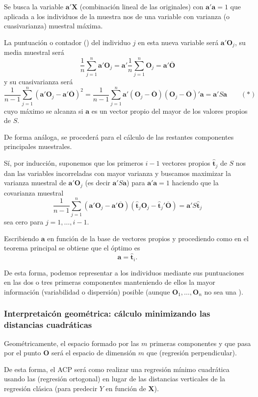 Se busca la variable $\mathbf{a'X}$ (combinación lineal de las originales) con $\mathbf{a'a}=1$ que aplicada a los individuos de la muestra nos de una variable con varianza (o cuasivarianza) muestral máxima.

La puntuación o contador () del individuo $j$ en esta nueva variable será $\mathbf{a'O}_j$, su media muestral será \[ \dfrac{1}{n}\sum_{j=1}^{n}\mathbf{a'O}_j=\mathbf{a'}\dfrac{1}{n}\sum_{j=1}^{n}\mathbf{O}_j=\mathbf{a'\overline{O}} \] y su cuasivarianza será \[ \dfrac{1}{n-1}\sum_{j=1}^{n}(\mathbf{a'O}_j-\mathbf{a'\overline{O}})^2=\dfrac{1}{n-1}\sum_{j=1}^{n}\mathbf{a'}(\mathbf{O}_j-\overline{\mathbf{O}})(\mathbf{O}_j-\overline{\mathbf{O}})'\mathbf{a}=\mathbf{a'}S\mathbf{a}\qquad(\ast) \]cuyo máximo se alcanza si $\mathbf{a}$ es un vector propio del mayor de los valores propios de $S$.

De forma análoga, se procederá para el cálculo de las restantes componentes principales muestrales.

Sí, por inducción, suponemos que los primeros $i-1$ vectores propios $\mathbf{\hat{t}}_j$ de $S$ nos dan las variables incorreladas con mayor varianza y buscamos maximizar la varianza muestral de $\mathbf{a'O}_j$ (es decir $\mathbf{a}'S\mathbf{a}$) para $\mathbf{a'a}=1$ haciendo que la covarianza muestral \[ \dfrac{1}{n-1}\sum_{j=1}^{n}(\mathbf{a'O}_j-\mathbf{a'\overline{O}})(\mathbf{\hat{t}}_j\mathbf{O}_j-\mathbf{\hat{t}}_j'\overline{\mathbf{O}})=\mathbf{a}'S\mathbf{\hat{t}}_j \]sea cero para $j=1,\dots,i-1$.

Escribiendo $\mathbf{a}$ en función de la base de vectores propios y procediendo como en el teorema principal se obtiene que el óptimo es \[ \mathbf{a}=\mathbf{\hat{t}}_i. \]

De esta forma, podemos representar a los individuos mediante sus puntuaciones en las dos o tres primeras componentes manteniendo de ellos la mayor información (variabilidad o dispersión) posible (aunque $\mathbf{O}_1,\dots,\mathbf{O}_n$ no sea una \mas).

\subsubsection{Interpretaicón geométrica: cálculo minimizando las distancias cuadráticas}
Geométricamente, el espacio formado por las $m$ primeras componentes y que pasa por el punto $\mathbf{O}$ será el espacio de dimensión $m$ que  (regresión perpendicular).

De esta forma, el ACP será como realizar una regresión mínimo cuadrática usando las  (regresión ortogonal) en lugar de las distancias verticales de la regresión clásica (para predecir $Y$ en función de $\mathbf{X}$).